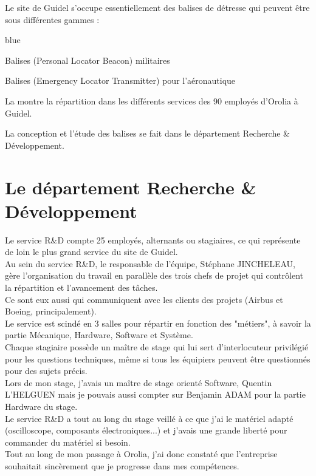 Le site de Guidel s'occupe essentiellement des balises de détresse qui peuvent être sous différentes gammes :

\begin{items}{blue}{\Circle}
    \item Balises  (Personal Locator Beacon) militaires
    \item Balises  (Emergency Locator Transmitter) pour l’aéronautique 
\end{items}




La  montre la répartition dans les différents services des 90 employés d'Orolia à Guidel.


La conception et l'étude des balises se fait dans le département Recherche \& Développement. 
\newline
\section{Le département Recherche \& Développement}

Le service R\&D compte 25 employés, alternants ou stagiaires, ce qui représente de loin le plus grand service du site de Guidel.\\

Au sein du service R\&D, le responsable de l’équipe, Stéphane JINCHELEAU, gère l’organisation du travail en parallèle des trois chefs de projet qui contrôlent la répartition et l’avancement des tâches. \\
Ce sont eux aussi qui communiquent avec les clients des projets (Airbus et Boeing, principalement).\\ 
Le service est scindé en 3 salles pour répartir en fonction des "métiers", à savoir la partie Mécanique, Hardware, Software et Système.\\
Chaque stagiaire possède un maître de stage qui lui sert d’interlocuteur privilégié pour les questions techniques, même si tous les équipiers peuvent être questionnés pour des sujets précis.\\ 

Lors de mon stage, j'avais un maître de stage orienté Software, Quentin L'HELGUEN mais je pouvais aussi compter sur Benjamin ADAM pour la partie Hardware du stage.\\
Le service R\&D a tout au long du stage veillé à ce que j'ai le matériel adapté (oscilloscope, composants électroniques...) et j'avais une grande liberté pour commander du matériel si besoin.\\
Tout au long de mon passage à Orolia, j'ai donc constaté que l'entreprise souhaitait sincèrement que je progresse dans mes compétences.
